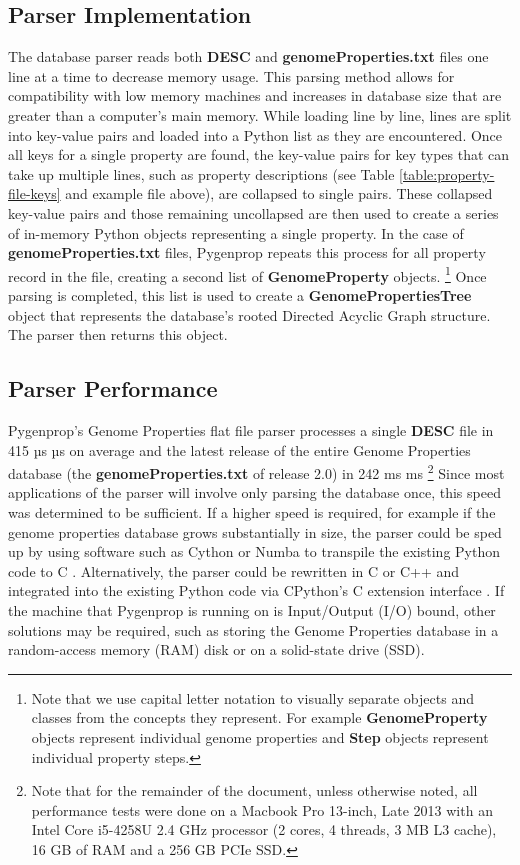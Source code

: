 \subsection{Parser Implementation}

The database parser reads both \textbf{DESC} and \textbf{genomeProperties.txt} files one line at a time to decrease memory usage. This parsing method allows for compatibility with low memory machines and increases in database size that are greater than a computer's main memory. While loading line by line, lines are split into key-value pairs and loaded into a Python list as they are encountered. Once all keys for a single property are found, the key-value pairs for key types that can take up multiple lines, such as property descriptions (see Table \ref{table:property-file-keys} and example file above), are collapsed to single pairs. These collapsed key-value pairs and those remaining uncollapsed are then used to create a series of in-memory Python objects representing a single property. In the case of \textbf{genomeProperties.txt} files, Pygenprop repeats this process for all property record in the file, creating a second list of \textbf{GenomeProperty} objects. \footnote{Note that we use capital letter notation to visually separate objects and classes from the concepts they represent. For example \textbf{GenomeProperty} objects represent individual genome properties and \textbf{Step} objects represent individual property steps.} Once parsing is completed, this list is used to create a \textbf{GenomePropertiesTree} object that represents the database's rooted Directed Acyclic Graph structure. The parser then returns this object.

\subsection{Parser Performance}

Pygenprop's Genome Properties flat file parser processes a single \textbf{DESC} file in 415 µs  µs on average and the latest release of the entire Genome Properties database (the \textbf{genomeProperties.txt} of release 2.0) in 242 ms  ms \footnote{Note that for the remainder of the document, unless otherwise noted, all performance tests were done on a Macbook Pro 13-inch, Late 2013 with an Intel Core i5-4258U 2.4 GHz processor (2 cores, 4 threads, 3 MB L3 cache), 16 GB of RAM and a 256 GB PCIe SSD.} Since most applications of the parser will involve only parsing the database once, this speed was determined to be sufficient. If a higher speed is required, for example if the genome properties database grows substantially in size, the parser could be sped up by using software such as Cython \cite{behnel2010cython} or Numba \cite{lam2015numba} to transpile the existing Python code to C \cite{kernighan2006c}. Alternatively, the parser could be rewritten in C or C++ \cite{ISO:1998:IIP} and integrated into the existing Python code via CPython's C extension interface \cite{van1995python}. If the machine that Pygenprop is running on is Input/Output (I/O) bound, other solutions may be required, such as storing the Genome Properties database in a random-access memory (RAM) disk or on a solid-state drive (SSD).

